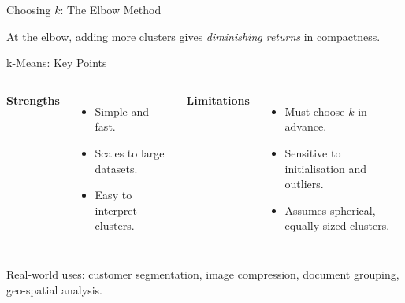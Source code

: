 \documentclass[10pt]{beamer}
\begin{document}
\begin{frame}{Choosing $k$: The Elbow Method}
    \begin{center}
    \end{center}
    \vspace{0.1cm}
    At the elbow, adding more clusters gives \textit{diminishing returns} in compactness.
\end{frame}

\begin{frame}{k-Means: Key Points}
    \begin{columns}[T,onlytextwidth]
        \textbf{Strengths}
        \begin{itemize}
            \item Simple and fast.
            \item Scales to large datasets.
            \item Easy to interpret clusters.
        \end{itemize}
        \textbf{Limitations}
        \begin{itemize}
            \item Must choose $k$ in advance.
            \item Sensitive to initialisation and outliers.
            \item Assumes spherical, equally sized clusters.
        \end{itemize}
    \end{columns}
    \vspace{0.3cm}
    Real-world uses: customer segmentation, image compression, document grouping, geo-spatial analysis.
\end{frame}

\end{document}

